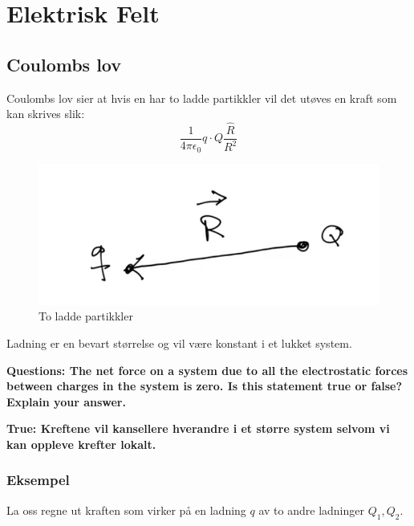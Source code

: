 \chapter{Elektrisk Felt}
  \section*{Coulombs lov}
    Coulombs lov sier at hvis en har to ladde partikkler vil det utøves en kraft som kan skrives slik:
    \[
    \frac{1}{4 π \epsilon_{0}} q ⋅ Q \frac{\hat{R}}{R^{2}}
    \]

    \begin{figure}[h!]
      \centering
      \includegraphics[scale = .7]{Bilder/Coulombs_lov.png}
      \caption{To ladde partikkler}
      \label{fig: Ladde partikkler}
    \end{figure}
  Ladning er en bevart størrelse og vil være konstant i et lukket system. \newline 

  \bf  Questions: The net force on a system due to all the electrostatic forces between charges in the system is zero. Is this statement true or false? Explain your answer. \newline \newline  
  
  \bf{True}: Kreftene vil kansellere hverandre i et større system selvom vi kan oppleve krefter lokalt. 
  
  \newpage 
  \subsection*{Eksempel}
    La oss regne ut kraften som virker på en ladning $ q $ av to andre ladninger $ Q_1, Q_2 $.
    
